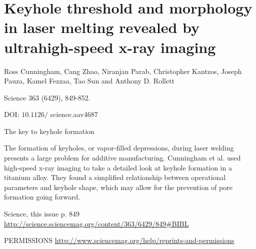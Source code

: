 \documentclass[10pt]{article}
\begin{document}
\section*{Keyhole threshold and morphology in laser melting revealed by ultrahigh-speed x-ray imaging}
Ross Cunningham, Cang Zhao, Niranjan Parab, Christopher Kantzos, Joseph Pauza, Kamel Fezzaa, Tao Sun and Anthony D. Rollett

Science 363 (6429), 849-852.

DOI: $10.1126 /$ science.aav4687

The key to keyhole formation

The formation of keyholes, or vapor-filled depressions, during laser welding presents a large problem for additive manufacturing. Cunningham et al. used high-speed x-ray imaging to take a detailed look at keyhole formation in a titanium alloy. They found a simplified relationship between operational parameters and keyhole shape, which may allow for the prevention of pore formation going forward.

Science, this issue p. 849 \href{http://science.sciencemag.org/content/363/6429/849#BIBL}{http://science.sciencemag.org/content/363/6429/849\#BIBL}

PERMISSIONS \href{http://www.sciencemag.org/help/reprints-and-permissions}{http://www.sciencemag.org/help/reprints-and-permissions}
\end{document}
